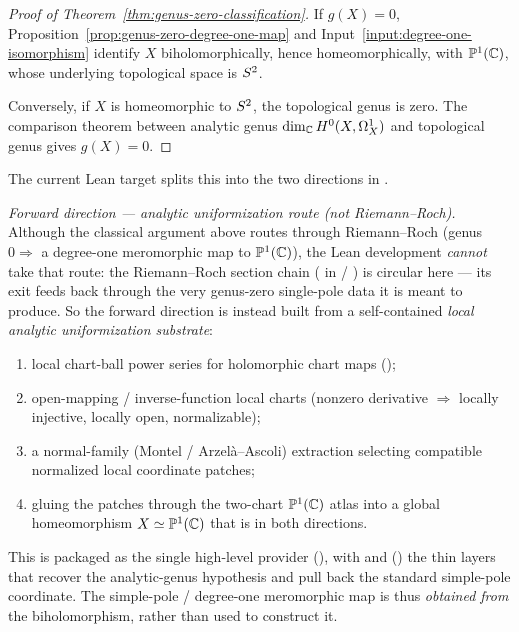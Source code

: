 \begin{proof}[Proof of Theorem~\ref{thm:genus-zero-classification}]
If \(g(X)=0\), Proposition~\ref{prop:genus-zero-degree-one-map} and
Input~\ref{input:degree-one-isomorphism} identify \(X\) biholomorphically,
hence homeomorphically, with \(\mathbb{P}^{1}(\mathbb{C})\), whose underlying topological space is
\(S^{2}\).

Conversely, if \(X\) is homeomorphic to \(S^{2}\), the topological genus is
zero. The comparison theorem between analytic genus
\(\dim_{\mathbb{C}}H^{0}(X,\Omega^{1}_{X})\) and topological genus gives \(g(X)=0\).
\end{proof}

\begin{formalizationnote}
The current Lean target splits this into the two directions in
.

\emph{Forward direction — analytic uniformization route (not Riemann--Roch).}
Although the classical argument above routes through Riemann--Roch
(genus \(0\Rightarrow\) a degree-one meromorphic map to \(\mathbb{P}^{1}(\mathbb{C})\)), the Lean
development \emph{cannot} take that route: the Riemann--Roch section chain
( in  /
) is circular here --- its
 exit feeds back through the very genus-zero
single-pole data it is meant to produce. So the forward direction is instead
built from a self-contained \emph{local analytic uniformization substrate}:
\begin{enumerate}
\item local chart-ball power series for holomorphic chart maps
  ();
\item open-mapping / inverse-function local charts (nonzero derivative
  \(\Rightarrow\) locally injective, locally open, normalizable);
\item a normal-family (Montel / Arzel\`a--Ascoli) extraction selecting
  compatible normalized local coordinate patches;
\item gluing the patches through the two-chart \(\mathbb{P}^{1}(\mathbb{C})\) atlas into a global
  homeomorphism \(X\simeq\mathbb{P}^{1}(\mathbb{C})\) that is  in both directions.
\end{enumerate}
This is packaged as the single high-level provider
(), with
 and
() the thin layers that recover the
analytic-genus hypothesis and pull back the standard simple-pole coordinate.
The simple-pole / degree-one meromorphic map is thus \emph{obtained from} the
biholomorphism, rather than used to construct it.


\end{formalizationnote}
